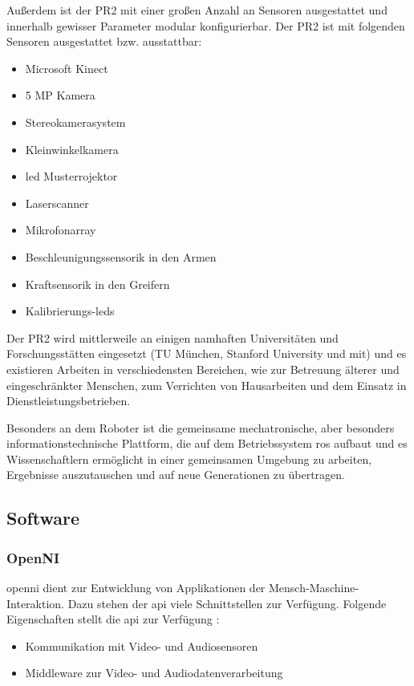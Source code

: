 Außerdem ist der PR2 mit einer großen Anzahl an Sensoren ausgestattet und innerhalb gewisser Parameter modular konfigurierbar.
Der PR2 ist mit folgenden Sensoren ausgestattet bzw. ausstattbar:

\begin{itemize}
  \item Microsoft Kinect
  \item 5 MP Kamera
  \item Stereokamerasystem
  \item Kleinwinkelkamera
  \item \gls{led} Musterrojektor
  \item Laserscanner
  \item Mikrofonarray
  \item Beschleunigungssensorik in den Armen
  \item Kraftsensorik in den Greifern
  \item Kalibrierungs-\glspl{led}
\end{itemize}

Der PR2 wird mittlerweile an einigen namhaften Universitäten und Forschungsstätten eingesetzt (\ua TU München, Stanford University und \gls{mit}) und es existieren Arbeiten in verschiedensten Bereichen, wie zur Betreuung älterer und eingeschränkter Menschen, zum Verrichten von Hausarbeiten  und dem Einsatz in Dienstleistungsbetrieben.

Besonders an dem Roboter ist die gemeinsame mechatronische, aber besonders informationstechnische Plattform, die auf dem Betriebssystem \gls{ros} aufbaut und es Wissenschaftlern ermöglicht in einer gemeinsamen Umgebung zu arbeiten, Ergebnisse auszutauschen und auf neue Generationen zu übertragen.



\subsection{Software}

\subsubsection{OpenNI}

\gls{openni} dient zur Entwicklung von Applikationen der Mensch-Maschine-Interaktion.
Dazu stehen der \gls{api} viele Schnittstellen zur Verfügung.
Folgende Eigenschaften stellt die \gls{api} zur Verfügung \cite{kinect_6}:

\begin{itemize}
  \item Kommunikation mit Video- und Audiosensoren
  \item Middleware zur Video- und Audiodatenverarbeitung
\end{itemize}


